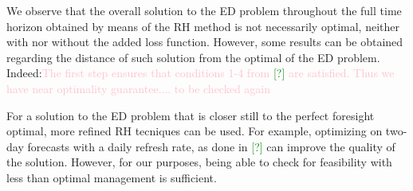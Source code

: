 We observe that the overall solution to the ED problem throughout the full time horizon obtained by means of the RH method is not necessarily optimal, neither with nor without the added loss function. 
However, some results can be obtained regarding the distance of such solution from the optimal of the ED problem. 
Indeed:\textcolor{pink}{The first step ensures that conditions 1-4 from \textcolor{green}{[?]} are satisfied. 
Thus we have near optimality guarantee.... to be checked again}

For a solution to the ED problem that is closer still to the perfect foresight optimal, more refined RH tecniques can be used. 
For example, optimizing on two-day forecasts with a daily refresh rate, as done in \textcolor{green}{[?]} can improve the quality of the solution. 
However, for our purposes, being able to check for feasibility with less than optimal management is sufficient.






































